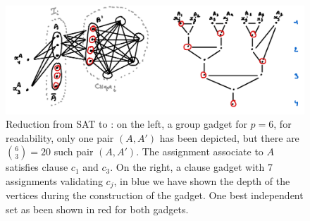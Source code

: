 \begin{figure}
    \includegraphics[width=\textwidth]{figures/indset-td-gadgets.png}
    \caption{Reduction from SAT to : on the left, a group gadget for $p = 6$, for readability, only one pair $(A, A')$ has been depicted, but there are $\binom{6}{3} = 20$ such pair $(A, A')$. The assignment associate to $A$ satisfies clause $c_1$ and $c_3$. On the right, a clause gadget with 7 assignments validating $c_j$, in blue we have shown the depth of the vertices during the construction of the gadget. One best independent set as been shown in red for both gadgets.}
    \label{fig:indset-td-gadgets}
\end{figure}